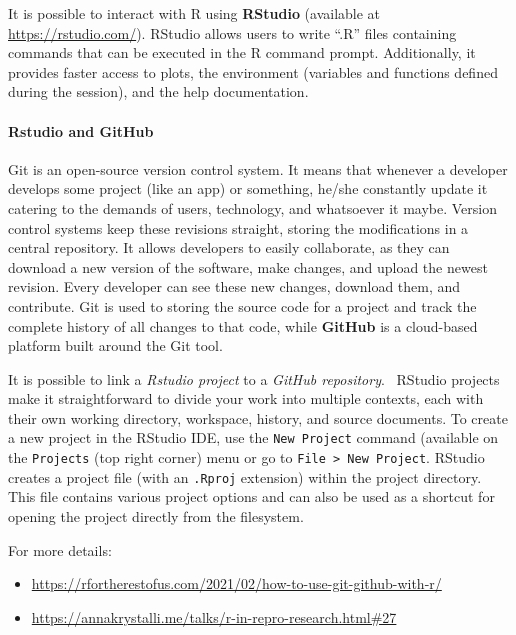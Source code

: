 \documentclass[
]{article}
\providecommand{\tightlist}{%
  \setlength{\itemsep}{0pt}\setlength{\parskip}{0pt}}
\begin{document}
It is possible to interact with R using \textbf{RStudio} (available at
\url{https://rstudio.com/}). RStudio allows users to write ``.R'' files
containing commands that can be executed in the R command prompt.
Additionally, it provides faster access to plots, the environment
(variables and functions defined during the session), and the help
documentation.

\hypertarget{rstudio-and-github}{%
\paragraph{Rstudio and GitHub}\label{rstudio-and-github}}

Git is an open-source version control system. It means that whenever a
developer develops some project (like an app) or something, he/she
constantly update it catering to the demands of users, technology, and
whatsoever it maybe. Version control systems keep these revisions
straight, storing the modifications in a central repository. It allows
developers to easily collaborate, as they can download a new version of
the software, make changes, and upload the newest revision. Every
developer can see these new changes, download them, and contribute. Git
is used to storing the source code for a project and track the complete
history of all changes to that code, while \textbf{GitHub} is a
cloud-based platform built around the Git tool.

It is possible to link a \emph{Rstudio project} to a \emph{GitHub
repository}. ~RStudio projects make it straightforward to divide your
work into multiple contexts, each with their own working directory,
workspace, history, and source documents. To create a new project in the
RStudio IDE, use the \texttt{New\ Project} command (available on the
\texttt{Projects} (top right corner) menu or go to
\texttt{File\ \textgreater{}\ New\ Project}. RStudio creates a project
file (with an \texttt{.Rproj} extension) within the project directory.
This file contains various project options and can also be used as a
shortcut for opening the project directly from the filesystem.

For more details:

\begin{itemize}
\tightlist
\item
  \url{https://rfortherestofus.com/2021/02/how-to-use-git-github-with-r/}
\item
  \url{https://annakrystalli.me/talks/r-in-repro-research.html\#27}
\end{itemize}
\end{document}
